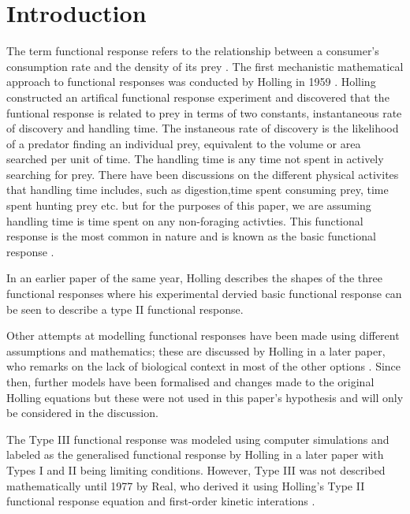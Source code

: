 \documentclass[11pt, a4paper, titlepage]{article}
\begin{document}
\newpage

\linenumbers




\section{Introduction}
The term functional response refers to the relationship between a consumer's consumption rate and the density of its prey \parencite{Solomon1949}.  The first mechanistic mathematical approach to functional responses was conducted by Holling in 1959 \parencite{Holling1959b}. Holling constructed an artifical functional response experiment and discovered that the funtional response is related to prey in terms of two constants, instantaneous rate of discovery and handling time. The instaneous rate of discovery is the likelihood of a predator finding an individual prey, equivalent to the volume or area searched per unit of time.
The handling time is any time not spent in actively searching for prey. There have been discussions on the different physical activites that handling time includes, such as digestion,time spent consuming prey, time spent hunting prey etc. \parencite{Jeschke2002, Holling1966} but for the purposes of this paper, we are assuming handling time is time spent on any non-foraging activties.
This functional response is the most common in nature and is known as the basic functional response \parencite{Holling1959b}.

In an earlier paper of the same year, Holling describes the shapes of the three functional responses \parencite{Holling1959a} where his experimental dervied basic functional response can be seen to describe a type II functional response.

Other attempts at modelling functional responses have been made using different assumptions and mathematics; these are discussed by Holling in a later paper, who remarks on the lack of biological context in most of the other options \parencite{Holling1965}. Since then, further models have been formalised and changes made to the original Holling equations but these were not used in this paper's hypothesis and  will only be considered in the discussion. 

\bigskip

The Type III functional response was modeled using computer simulations and labeled as the generalised functional response by Holling in a later paper \parencite{Holling1965} with Types I and II being limiting conditions. However, Type III was not described mathematically until 1977 by Real, who derived it using Holling's Type II functional response equation and first-order kinetic interations \parencite{Real1977}.
 
\end{document}
